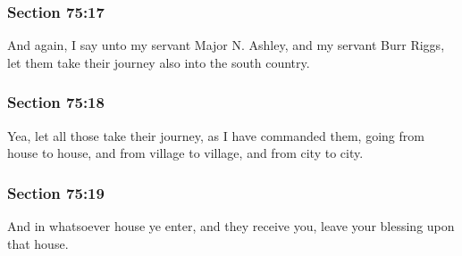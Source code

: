 	\subsubsection{Section 75:17} %
		\label{DC75-17}

		And again, I say unto my servant Major N. Ashley, and my servant Burr Riggs, let them take their journey also into the south country.


	\subsubsection{Section 75:18} %
		\label{DC75-18}

		Yea, let all those take their journey, as I have commanded them, going from house to house, and from village to village, and from city to city.


	\subsubsection{Section 75:19} %
		\label{DC75-19}

		And in whatsoever house ye enter, and they receive you, leave your blessing upon that house.


